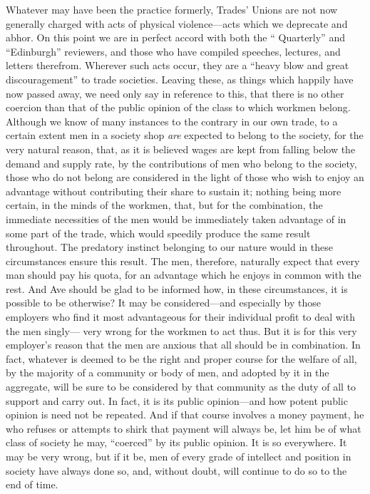 Whatever may have been the practice formerly, Trades' Unions are not now
generally charged with acts of physical violence---acts which we
deprecate and abhor. On this point we are in perfect accord with both
the `` Quarterly'' and ``Edinburgh'' reviewers, and those who have
compiled speeches, lectures, and letters therefrom. Wherever such acts
occur, they are a ``heavy blow and great discouragement'' to trade
societies. Leaving these, as things which happily have now passed away,
we need only say in reference to this, that there is no other coercion
than that of the public opinion of the class to which workmen belong.
Although we know of many instances to the contrary in our own trade, to
a certain extent men in a society shop \textit{are} expected to belong
to the society, for the very natural reason, that, as it is believed
wages are kept from falling below the demand and supply rate, by the
contributions of men who belong to the society, those who do not belong
are considered in the light of those who wish to enjoy an advantage
without contributing their share to sustain it; nothing being more
certain, in the minds of the workmen, that, but for the combination, the
immediate necessities of the men would be immediately taken advantage of
in some part of the trade, which would speedily produce the same result
throughout. The predatory instinct belonging to our nature would in
these circumstances ensure this result. The men, therefore, naturally
expect that every man should pay his quota, for an advantage which he
enjoys in common with the rest. And Ave should be glad to be informed
how, in these circumstances, it is possible to be otherwise? It may be
considered---and especially by those employers who find it most
advantageous for their individual profit to deal with the men singly---
very wrong for the workmen to act thus. But it is for this very
employer's reason that the men are anxious that all should be in
combination. In fact, whatever is deemed to be the right and proper
course for the welfare of all, by the majority of a community or body of
men, and adopted by it in the aggregate, will be sure to be considered
by that community as the duty of all to support and carry out. In fact,
it is its public opinion---and how potent public opinion is need not be
repeated. And if that course involves a money payment, he who refuses or
attempts to shirk that payment will always be, let him be of what class
of society he may, ``coerced'' by its public opinion. It is so
everywhere. It may be very wrong, but if it be, men of every grade of
intellect and position in society have always done so, and, without
doubt, will continue to do so to the end of time.

